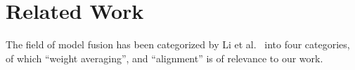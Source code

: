 \section{Related Work}





The field of model fusion has been categorized by Li et al.~\cite{li2023deep} into four categories, of which ``weight averaging'', and ``alignment'' is of relevance to our work.

